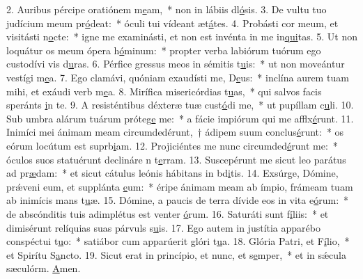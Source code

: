 2. Auribus pércipe oratiónem m\uline{e}am,~* non in lábiis dl\uline{ó}sis.
3. De vultu tuo judícium meum pr\uline{ó}deat:~* óculi tui vídeant æt\uline{á}tes.
4. Probásti cor meum, et visitásti n\uline{o}cte:~* igne me examinásti, et non est invénta in me in\uline{qui}tas.
5. Ut non loquátur os meum ópera h\uline{ó}minum:~* propter verba labiórum tuórum ego custodívi vis d\uline{u}ras.
6. Pérfice gressus meos in sémitis t\uline{u}is:~* ut non moveántur vestígi m\uline{e}a.
7. Ego clamávi, quóniam exaudísti me, D\uline{e}us:~* inclína aurem tuam mihi, et exáudi verb m\uline{e}a.
8. Mirífica misericórdias t\uline{u}as,~* qui salvos facis speránts \uline{i}n te.
9. A resisténtibus déxteræ tuæ cust\uline{ó}di me,~* ut pupíllam c\uline{u}li.
10. Sub umbra alárum tuárum próteg\uline{e} me:~* a fácie impiórum qui me afflx\uline{é}runt.
11. Inimíci mei ánimam meam circumdedérunt,~† ádipem suum conclus\uline{é}runt:~* os eórum locútum est suprb\uline{i}am.
12. Projiciéntes me nunc circumded\uline{é}runt me:~* óculos suos statuérunt declináre n t\uline{e}rram.
13. Suscepérunt me sicut leo parátus ad pr\uline{æ}dam:~* et sicut cátulus leónis hábitans in bd\uline{i}tis.
14. Exsúrge, Dómine, prǽveni eum, et supplánta \uline{e}um:~* éripe ánimam meam ab ímpio, frámeam tuam ab inimícis mans t\uline{u}æ.
15. Dómine, a paucis de terra dívide eos in vita e\uline{ó}rum:~* de abscónditis tuis adimplétus est venter \uline{ó}rum.
16. Saturáti sunt f\uline{í}liis:~* et dimisérunt relíquias suas párvuls s\uline{u}is.
17. Ego autem in justítia apparébo conspéctui t\uline{u}o:~* satiábor cum apparúerit glóri t\uline{u}a.
18. Glória Patri, et F\uline{í}lio,~* et Spirítu S\uline{a}ncto.
19. Sicut erat in princípio, et nunc, et s\uline{e}mper,~* et in sǽcula sæculórm. \uline{A}men.

